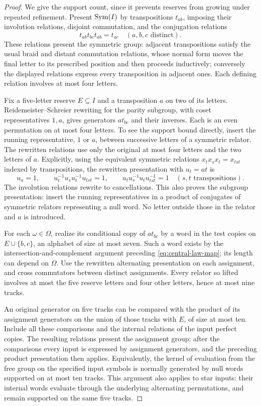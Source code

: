 \begin{proof}
We give the support count, since it prevents reserves from growing
under repeated refinement.  Present $\operatorname{Sym}(I)$ by transpositions
$t_{ab}$, imposing their involution relations, disjoint
commutation, and the conjugation relations
\[
 t_{ab}t_{bc}t_{ab}=t_{ac}\quad(a,b,c\text{ distinct}).
\]
These relations present the symmetric group: adjacent
transpositions satisfy the usual braid and distant commutation
relations, whose normal form moves the final letter to its
prescribed position and then proceeds inductively; conversely
the displayed relations express every transposition in adjacent
ones.  Each defining relation involves at most four letters.

Fix a five-letter reserve $E\subseteq I$ and a transposition
$a$ on two of its letters.  Reidemeister--Schreier rewriting for
the parity subgroup, with coset representatives $1,a$, gives
generators $a t_{bc}$ and their inverses.  Each is an even
permutation on at most four letters.  To see the support bound
directly, insert the running representative, $1$ or $a$, between
successive letters of a symmetric relator.  The rewritten
relations use only the original at most four letters and the
two letters of $a$.  Explicitly, using the equivalent symmetric
relations $x_tx_sx_t=x_{tst}$ indexed by transpositions, the
rewritten presentation with $u_t=at$ is
\[
 u_a=1,\qquad
 u_t^{-1}u_su_t^{-1}u_{tst}=1,\qquad
 u_tu_s^{-1}u_tu_{tst}^{-1}=1
 \quad(s,t\text{ transpositions}).
\]
The involution relations rewrite to cancellations.
This also proves the subgroup presentation: insert the running
representatives in a product of conjugates of symmetric relators
representing a null word.  No letter outside those in the relator
and $a$ is introduced.

For each $\omega\in\Omega$, realize its conditional copy of
$a t_{bc}$ by a word in the test copies on
$E\cup\{b,c\}$, an alphabet of size at most seven.  Such a
word exists by the intersection-and-complement argument preceding
\eqref{eq:central-law-map}; its length can depend on $\Omega$.
Use the rewritten alternating presentation on each assignment,
and cross commutators between distinct assignments.  Every
relator so lifted involves at most the five reserve letters
and four other letters, hence at most nine tracks.

An original generator on five tracks can be compared with the
product of its assignment generators on the union of those
tracks with $E$, of size at most ten.  Include all these
comparisons and the internal relations of the input perfect
copies.  The resulting relations present the assignment group:
after the comparisons every input is expressed by assignment
generators, and the preceding product presentation then applies.
Equivalently, the kernel of evaluation from the free group on
the specified input symbols is normally generated by null
words supported on at most ten tracks.  This argument also
applies to star inputs: their internal words evaluate through
the underlying alternating permutations, and remain supported
on the same five tracks.


\end{proof}
